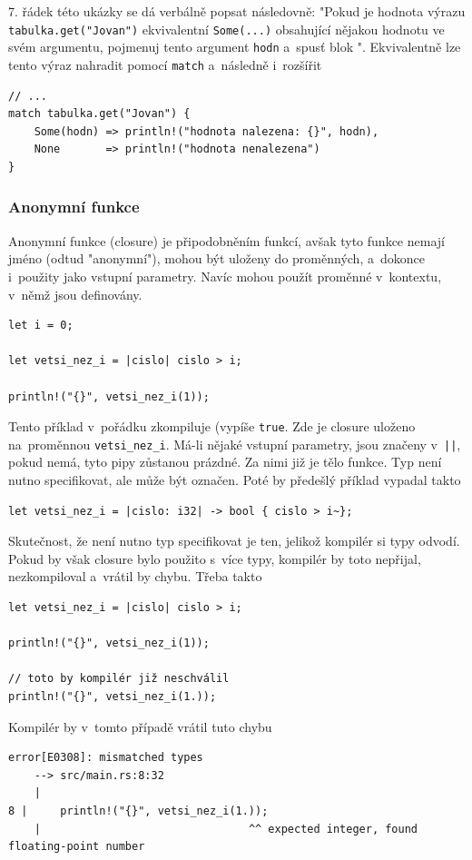 \documentclass[a4paper, 12pt]{article} %
\newcommand{\rust}[1]{\texttt{#1}}
\begin{document}
		7. řádek této ukázky se dá verbálně popsat následovně: "Pokud je hodnota výrazu \rust{tabulka.get("Jovan")} ekvivalentní \rust{Some(...)} obsahující nějakou hodnotu ve svém argumentu, pojmenuj tento argument \texttt{hodn} a~spusť blok \texttt{\string{\dots\string}}". Ekvivalentně lze tento výraz nahradit pomocí \rust{match} a~následně i~rozšířit
		\begin{verbatim}
// ...
match tabulka.get("Jovan") {
	Some(hodn) => println!("hodnota nalezena: {}", hodn),
	None       => println!("hodnota nenalezena")
}
		\end{verbatim}
		
		\subsubsection*{Anonymní funkce}
			Anonymní funkce (closure) je připodobněním funkcí, avšak tyto funkce nemají jméno (odtud "anonymní"), mohou být uloženy do proměnných, a~dokonce i~použity jako vstupní parametry. Navíc mohou použít proměnné v~kontextu, v~němž jsou definovány.
			\begin{verbatim}
let i = 0;

let vetsi_nez_i = |cislo| cislo > i;

println!("{}", vetsi_nez_i(1));
			\end{verbatim}
			
			Tento příklad v~pořádku zkompiluje (vypíše \texttt{true}. Zde je closure uloženo na~proměnnou \rust{vetsi_nez_i}. Má-li nějaké vstupní parametry, jsou značeny v~\rust{||}, pokud nemá, tyto pipy zůstanou prázdné. Za nimi již je tělo funkce. Typ není nutno specifikovat, ale může být označen. Poté by předešlý příklad vypadal takto
			\begin{verbatim}
let vetsi_nez_i = |cislo: i32| -> bool { cislo > i~};
			\end{verbatim}
			
			Skutečnost, že není nutno typ specifikovat je ten, jelikož kompilér si typy odvodí. Pokud by však closure bylo použito s~více typy, kompilér by toto nepřijal, nezkompiloval a~vrátil by chybu. Třeba takto
			\begin{verbatim}
let vetsi_nez_i = |cislo| cislo > i;

println!("{}", vetsi_nez_i(1));

// toto by kompilér již neschválil
println!("{}", vetsi_nez_i(1.));
			\end{verbatim}
			
			Kompilér by v~tomto případě vrátil tuto chybu
			\begin{verbatim}
error[E0308]: mismatched types
	--> src/main.rs:8:32
	|
8 |     println!("{}", vetsi_nez_i(1.));
	|                                ^^ expected integer, found floating-point number
			\end{verbatim}
\end{document}
